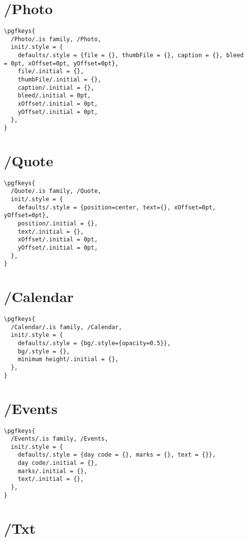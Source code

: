 \documentclass[11pt,oneside]{memoir-article}
\begin{document}
\section{/Photo}
\label{sec:org1803ada}

\begin{verbatim}
\pgfkeys{
  /Photo/.is family, /Photo,
  init/.style = {
    defaults/.style = {file = {}, thumbFile = {}, caption = {}, bleed = 0pt, xOffset=0pt, yOffset=0pt},
    file/.initial = {},
    thumbFile/.initial = {},
    caption/.initial = {},
    bleed/.initial = 0pt,
    xOffset/.initial = 0pt,
    yOffset/.initial = 0pt,
  },
}
\end{verbatim}

\section{/Quote}
\label{sec:org8ee070b}

\begin{verbatim}
\pgfkeys{
  /Quote/.is family, /Quote,
  init/.style = {
    defaults/.style = {position=center, text={}, xOffset=0pt, yOffset=0pt},
    position/.initial = {},
    text/.initial = {},
    xOffset/.initial = 0pt,
    yOffset/.initial = 0pt,
  },
}
\end{verbatim}

\section{/Calendar}
\label{sec:org9f52d99}

\begin{verbatim}
\pgfkeys{
  /Calendar/.is family, /Calendar,
  init/.style = {
    defaults/.style = {bg/.style={opacity=0.5}},
    bg/.style = {},
    minimum height/.initial = {},
  },
}
\end{verbatim}

\section{/Events}
\label{sec:org7c5239a}

\begin{verbatim}
\pgfkeys{
  /Events/.is family, /Events,
  init/.style = {
    defaults/.style = {day code = {}, marks = {}, text = {}},
    day code/.initial = {},
    marks/.initial = {},
    text/.initial = {},
  },
}
\end{verbatim}

\section{/Txt}
\label{sec:org1d9595e}
\end{document}

